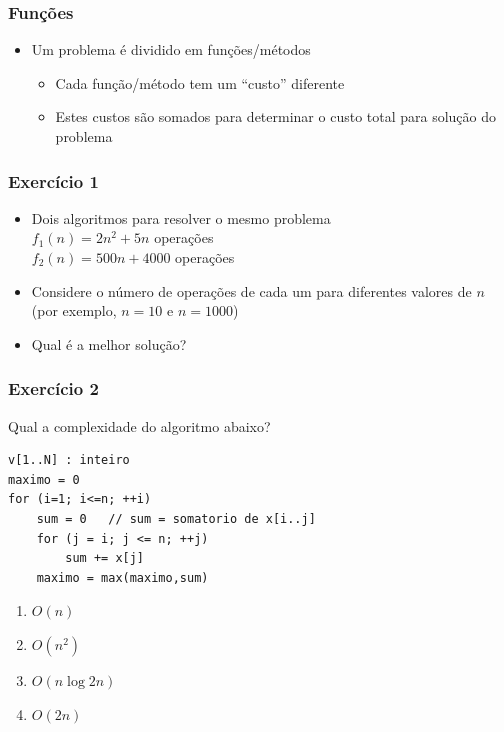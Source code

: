 \documentclass[aspectratio=169]{beamer}
\begin{document}
\begin{frame}\frametitle{Funções}
\begin{itemize}
	\item Um problema é dividido em funções/métodos
	\begin{itemize}
		\item Cada função/método tem um ``custo'' diferente
		\item Estes custos são somados para determinar o custo total para solução do problema
	\end{itemize}
\end{itemize}
\end{frame}

\begin{frame}\frametitle{Exercício 1}
\begin{itemize}
	\item Dois algoritmos para resolver o mesmo problema\\
$f_{1}(n) = 2n^2 + 5n$ operações\\
$f_{2}(n) = 500n + 4000$ operações
	\item Considere o número de operações de cada um para diferentes valores de $n$ (por exemplo, $n = 10$ e $n = 1000$)
	\item Qual é a melhor solução?
\end{itemize}
\end{frame}

\begin{frame}[fragile]\frametitle{Exercício 2} %
Qual a complexidade do algoritmo abaixo?
{\scriptsize
\begin{verbatim}
v[1..N] : inteiro
maximo = 0
for (i=1; i<=n; ++i)
    sum = 0   // sum = somatorio de x[i..j]
    for (j = i; j <= n; ++j)
        sum += x[j]
    maximo = max(maximo,sum)
\end{verbatim}
}
\begin{enumerate}[A]
	\item $O(n)$
	\item $O(n^2)$ %
	\item $O(n \log 2n)$
	\item $O(2n)$
\end{enumerate}
\end{frame}
\end{document}
